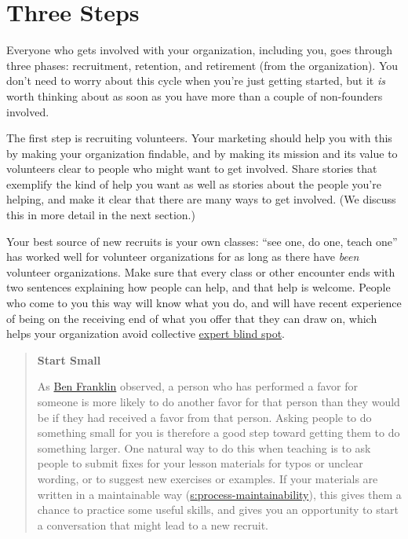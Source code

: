 \section{Three Steps}\label{s:community-three-steps}

Everyone who gets involved with your organization, including you, goes
through three phases: recruitment, retention, and retirement (from the
organization). You don't need to worry about this cycle when you're just
getting started, but it \emph{is} worth thinking about as soon as you have
more than a couple of non-founders involved.

The first step is recruiting volunteers. Your marketing should help you
with this by making your organization findable, and by making its
mission and its value to volunteers clear to people who might want to
get involved. Share stories that exemplify the kind of help you want as
well as stories about the people you're helping, and make it clear that
there are many ways to get involved. (We discuss this in more detail in
the next section.)

Your best source of new recruits is your own classes: ``see one, do one,
teach one'' has worked well for volunteer organizations for as long as
there have \emph{been} volunteer organizations. Make sure that every class or
other encounter ends with two sentences explaining how people can help,
and that help is welcome. People who come to you this way will know what
you do, and will have recent experience of being on the receiving end of
what you offer that they can draw on, which helps your organization
avoid collective \protect\hyperlink{g:expert-blind-spot}{expert blind spot}.

\begin{quote}\setlength{\parindent}{0pt}
\textbf{Start Small}

As \href{https://en.wikipedia.org/wiki/Ben_Franklin_effect}{Ben Franklin} observed, a person who has
performed a favor for someone is more likely to do another favor for
that person than they would be if they had received a favor from
that person. Asking people to do something small for you is
therefore a good step toward getting them to do something
larger. One natural way to do this when teaching is to ask people to
submit fixes for your lesson materials for typos or unclear wording,
or to suggest new exercises or examples. If your materials are
written in a maintainable way
(\protect\hyperlink{SECTION}{s:process-maintainability}), this gives them a chance to
practice some useful skills, and gives you an opportunity to start a
conversation that might lead to a new recruit.
\end{quote}

